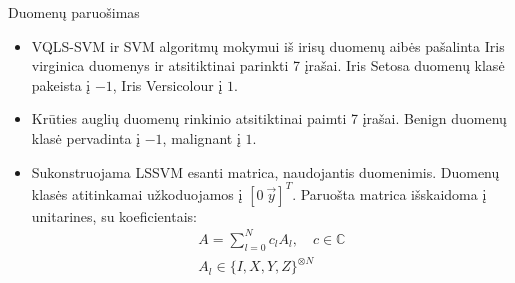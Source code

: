 \begin{frame}{Duomenų paruošimas}
    \begin{itemize}
        \item VQLS-SVM ir SVM algoritmų mokymui iš irisų duomenų aibės pašalinta Iris virginica duomenys ir atsitiktinai parinkti 7 įrašai. Iris Setosa duomenų klasė pakeista į $-1$, Iris Versicolour į $1$.
        \item Krūties auglių duomenų rinkinio atsitiktinai paimti 7 įrašai. Benign duomenų klasė pervadinta į $-1$, malignant į $1$.
        \item Sukonstruojama LSSVM esanti matrica, naudojantis duomenimis. Duomenų klasės atitinkamai užkoduojamos į $\left[0\  \vec{y}\right]^T$. Paruošta matrica išskaidoma į unitarines, su koeficientais:
        \begin{gather}
            A = \sum_{l=0}^N c_l A_l, \quad c\in \mathbb{C} \nonumber\\
            A_l \in \{I,X,Y,Z\}^{\otimes N}\nonumber
        \end{gather}    
            
    \end{itemize}
\end{frame}

